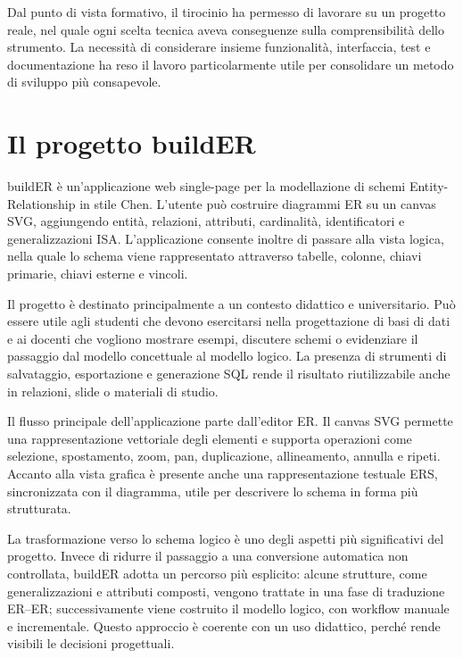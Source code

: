 \documentclass{unipd-thesis-modern}
\newcommand{\builder}{buildER}
\begin{document}
Dal punto di vista formativo, il tirocinio ha permesso di lavorare su un progetto reale, nel quale ogni scelta tecnica aveva conseguenze sulla comprensibilità dello strumento. La necessità di considerare insieme funzionalità, interfaccia, test e documentazione ha reso il lavoro particolarmente utile per consolidare un metodo di sviluppo più consapevole.

\chapter{Il progetto \builder}

\builder{} è un'applicazione web single-page per la modellazione di schemi Entity-Relationship in stile Chen. L'utente può costruire diagrammi ER su un canvas SVG, aggiungendo entità, relazioni, attributi, cardinalità, identificatori e generalizzazioni ISA. L'applicazione consente inoltre di passare alla vista logica, nella quale lo schema viene rappresentato attraverso tabelle, colonne, chiavi primarie, chiavi esterne e vincoli.

Il progetto è destinato principalmente a un contesto didattico e universitario. Può essere utile agli studenti che devono esercitarsi nella progettazione di basi di dati e ai docenti che vogliono mostrare esempi, discutere schemi o evidenziare il passaggio dal modello concettuale al modello logico. La presenza di strumenti di salvataggio, esportazione e generazione SQL rende il risultato riutilizzabile anche in relazioni, slide o materiali di studio.

Il flusso principale dell'applicazione parte dall'editor ER. Il canvas SVG permette una rappresentazione vettoriale degli elementi e supporta operazioni come selezione, spostamento, zoom, pan, duplicazione, allineamento, annulla e ripeti. Accanto alla vista grafica è presente anche una rappresentazione testuale ERS, sincronizzata con il diagramma, utile per descrivere lo schema in forma più strutturata.

La trasformazione verso lo schema logico è uno degli aspetti più significativi del progetto. Invece di ridurre il passaggio a una conversione automatica non controllata, \builder{} adotta un percorso più esplicito: alcune strutture, come generalizzazioni e attributi composti, vengono trattate in una fase di traduzione ER--ER; successivamente viene costruito il modello logico, con workflow manuale e incrementale. Questo approccio è coerente con un uso didattico, perché rende visibili le decisioni progettuali.
\end{document}
